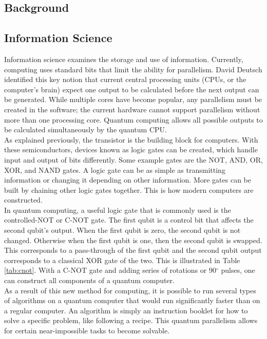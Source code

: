 \documentclass[11pt]{article}
\newcommand{\super}[1]{\ensuremath{^{\textrm{#1}}}}
\begin{document}
\begin{multicols}{2}
\section{\textbf{Background}}
  \subsection{Information Science}
  Information science examines the storage and use of information. Currently, computing uses standard bits that limit the ability for parallelism. David Deutsch identified this key notion that current central processing units (CPUs, or the computer's brain) expect one output to be calculated before the next output can be generated.\cite{lnmr} While multiple cores have become popular, any parallelism must be created in the software; the current hardware cannot support parallelism without more than one processing core. Quantum computing allows all possible outputs to be calculated simultaneously by the quantum CPU.\cite{lnmr} \\

As explained previously, the transistor is the building block for computers. With these semiconductors, devices known as logic gates can be created, which handle input and output of bits differently. Some example gates are the NOT, AND, OR, XOR, and NAND gates. A logic gate can be as simple as transmitting information or changing it depending on other information. More gates can be built by chaining other logic gates together. This is how modern computers are constructed. \\

In quantum computing, a useful logic gate that is commonly used is the controlled-NOT or C-NOT gate.\cite{lnmr,mit-lab,c-not} The first qubit is a control bit that affects the second qubit's output. When the first qubit is zero, the second qubit is not changed. Otherwise when the first qubit is one, then the second qubit is swapped. This corresponds to a pass-through of the first qubit and the second qubit output corresponds to a classical XOR gate of the two. This is illustrated in Table \ref{tab:cnot}. With a C-NOT gate and adding series of rotations or 90\super{$\circ$} pulses, one can construct all components of a quantum computer.\cite{gates} \\

As a result of this new method for computing, it is possible to run several types of algorithms on a quantum computer that would run significantly faster than on a regular computer. An algorithm is simply an instruction booklet for how to solve a specific problem, like following a recipe. This quantum parallelism allows for certain near-impossible tasks to become solvable.


\end{multicols}
\end{document}
